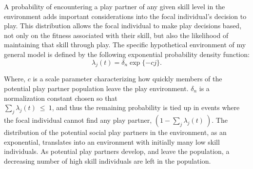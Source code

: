 \documentclass[12pt, letterpaper, fleqn]{article}
\begin{document}
      A probability of encountering a play partner of any given skill level in the environment adds important considerations into the focal individual's decision to play.
      This distribution allows the focal individual to make play decisions based, not only on the fitness associated with their skill, but also the likelihood of maintaining that skill through play. %
      The specific hypothetical environment of my general model is defined by the following exponential probability density function:            
      \begin{equation}
      \lambda_j(t) = \delta_n \exp\{-cj\}.
      \label{lambda_j}
      \end{equation}
      
      Where, $c$ is a scale parameter characterizing how quickly members of the potential play partner population leave the play environment.
      $\delta_n$ is a normalization constant chosen so that \\$\sum_j \lambda_j(t)~\le~1$, and thus the remaining  probability is tied up in events where the focal individual cannot find any play partner, $(1-\sum_j \lambda_j(t)~)$. %
      The distribution of the potential social play partners in the environment, as an exponential, translates into an environment with initially many low skill individuals.
      As potential play partners develop, and leave the population, a decreasing number of high skill individuals are left in the population. %
      
      
\end{document}
